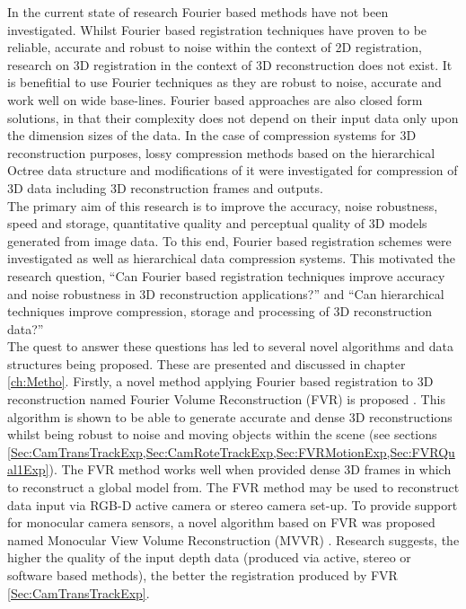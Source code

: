 In the current state of research Fourier based methods have not been investigated. Whilst Fourier based registration techniques have proven to be reliable, accurate and robust to noise within the context of 2D registration, research on 3D registration in the context of 3D reconstruction does not exist. It is benefitial to use Fourier techniques as they are robust to noise, accurate and work well on wide base-lines. Fourier based approaches are also closed form solutions, in that their complexity does not depend on their input data only upon the dimension sizes of the data. In the case of compression systems for 3D reconstruction purposes, lossy compression methods based on the hierarchical Octree data structure and modifications of it \cite{Lincoln13Interpolating} were investigated for compression of 3D data including 3D reconstruction frames and outputs. \\

The primary aim of this research is to improve the accuracy, noise robustness, speed and storage, quantitative quality and perceptual quality of 3D models generated from image data. To this end, Fourier based registration schemes were investigated as well as hierarchical data compression systems. This motivated the research question, ``Can Fourier based registration techniques improve accuracy and noise robustness in 3D reconstruction applications?'' and ``Can hierarchical techniques improve compression, storage and processing of 3D reconstruction data?'' \\

The quest to answer these questions has led to several novel algorithms and data structures being proposed. These are presented and discussed in chapter \ref{ch:Metho}. Firstly, a novel method applying Fourier based registration to 3D reconstruction named Fourier Volume Reconstruction (FVR) is proposed \cite{Lincoln16Fourier,Lincoln16Dense}. This algorithm is shown to be able to generate accurate and dense 3D reconstructions whilst being robust to noise and moving objects within the scene (see sections \ref{Sec:CamTransTrackExp,Sec:CamRoteTrackExp,Sec:FVRMotionExp,Sec:FVRQual1Exp}). The FVR method works well when provided dense 3D frames in which to reconstruct a global model from. The FVR method may be used to reconstruct data input via RGB-D active camera or stereo camera set-up. To provide support for monocular camera sensors, a novel algorithm based on FVR was proposed named Monocular View Volume Reconstruction (MVVR) \cite{Lincoln16Monocular}. Research suggests, the higher the quality of the input depth data (produced via active, stereo or software based methods), the better the registration produced by FVR \ref{Sec:CamTransTrackExp}. \\

